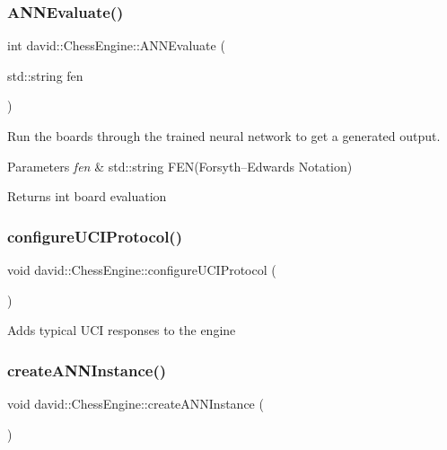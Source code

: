 \subsubsection{\texorpdfstring{A\+N\+N\+Evaluate()}{ANNEvaluate()}\hspace{0.1cm}{\footnotesize\ttfamily [2/2]}}
{\footnotesize\ttfamily int david\+::\+Chess\+Engine\+::\+A\+N\+N\+Evaluate (\begin{DoxyParamCaption}\item[{std\+::string}]{fen }\end{DoxyParamCaption})}

Run the boards through the trained neural network to get a generated output.


\begin{DoxyParams}{Parameters}
{\em fen} & std\+::string F\+EN(Forsyth–\+Edwards Notation) \\
\hline
\end{DoxyParams}
\begin{DoxyReturn}{Returns}
int board evaluation 
\end{DoxyReturn}
\mbox{\label{classdavid_1_1ChessEngine_acb677e30d52e8a66f96eaa6954418a9e}} 
\subsubsection{\texorpdfstring{configure\+U\+C\+I\+Protocol()}{configureUCIProtocol()}}
{\footnotesize\ttfamily void david\+::\+Chess\+Engine\+::configure\+U\+C\+I\+Protocol (\begin{DoxyParamCaption}{ }\end{DoxyParamCaption})}

Adds typical U\+CI responses to the engine \mbox{\label{classdavid_1_1ChessEngine_a0f3c9b1664dc4e8eb84bde2da018500d}} 
\subsubsection{\texorpdfstring{create\+A\+N\+N\+Instance()}{createANNInstance()}}
{\footnotesize\ttfamily void david\+::\+Chess\+Engine\+::create\+A\+N\+N\+Instance (\begin{DoxyParamCaption}{ }\end{DoxyParamCaption})}

